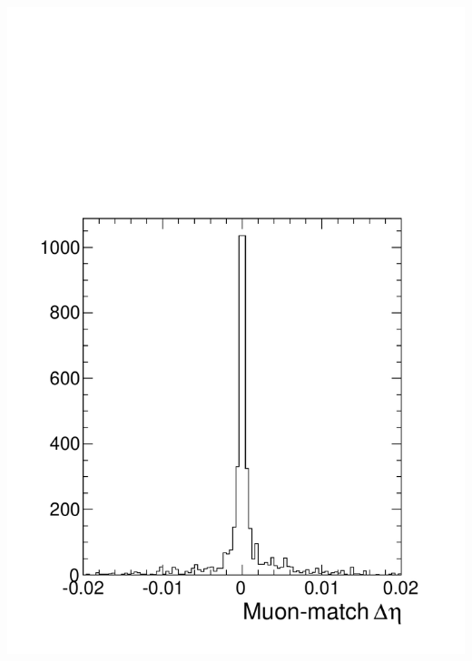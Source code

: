 \documentclass[compress]{beamer}
\begin{document}
\begin{frame}
\begin{columns}
\includegraphics[width=\linewidth]{match_deta_background.pdf}
\end{columns}
\end{frame}
\end{document}
